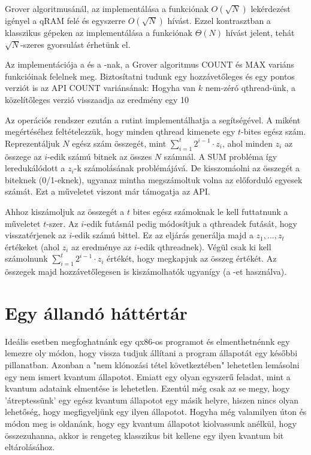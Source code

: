 \indent Grover algoritmusánál, az implementálása a  funkciónak ${O(\sqrt{N})}$ lekérdezést igényel a qRAM felé és egyszerre ${O(\sqrt{N})}$ hívást.
Ezzel kontrasztban a klasszikus gépeken az implementálása a  funkciónak ${\Theta(N)}$ hívást jelent, tehát $\sqrt{N}$-szeres gyorsulást érhetünk el.

\indent Az implementációja a  és a -nak, a Grover algoritmus COUNT és MAX variáns funkcióinak felelnek meg.
Biztosítatni tudunk egy hozzávetőleges és egy pontos verziót is az API COUNT variánsának: Hogyha van $k$ nem-zéró qthread-ünk, a közelítőleges verzió visszaadja az eredmény egy 10%

\indent Az operációs rendszer ezután a  rutint implementálhatja a  segítségével.
A miként megértéséhez feltételezzük, hogy minden qthread kimenete egy $t$-bites egész szám.
Reprezentáljuk $N$ egész szám összegét, mint $\sum_{i=1}^{t}{2^{i-1}\cdot z_i}$, ahol minden $z_i$ az összege az $i$-edik számú bitnek az összes $N$ számnál.
A SUM probléma így leredukálódott a $z_i$-k számolásának problémájává.
De kisszomáolni az összegét a biteknek (0/1-eknek), ugyanaz mintha megszámoltuk volna az előforduló egyesek számát.
Ezt a műveletet viszont már támogatja az API.

\indent Ahhoz kiszámoljuk az összegét a $t$ bites egész számoknak le kell futtatnunk a  műveletet $t$-szer.
Az $i$-edik futásnál pedig módosítjuk a qthreadek futását, hogy visszatérjenek az $i$-edik számú bittel.
Ez az eljárás generálja majd a $z_1,...,z_t$ értékeket (ahol $z_i$ az eredménye az $i$-edik qthreadnek). Végül csak ki kell számolnunk $\sum_{i=1}^{t}{2^{i-1}\cdot z_i}$ értékét, hogy megkapjuk az összeg értékét.
Az összegek majd hozzávetőlegesen is kiszámolhatók ugyanígy (a -et használva).
\section{Egy állandó háttértár}

\indent Ideális esetben megfoghatnánk egy qx86-os programot és elmenthetnénnk egy lemezre oly módon, hogy vissza tudjuk állítani a program állapotát egy későbbi pillanatban.
Azonban a "nem klónozási tétel következtében" lehetetlen lemásolni egy nem ismert kvantum állapotot.
Emiatt egy olyan egyszerű feladat, mint a kvantum adataink elmentése is lehetetlen.
Ezentúl még csak az se megy, hogy 'átreptessünk' egy egész kvantum állapotot egy másik helyre, hiszen nincs olyan lehetőség, hogy megfigyeljünk egy ilyen állapotot.
Hogyha még valamilyen úton és módon meg is oldanánk, hogy egy kvantum állapotot kiolvassunk anélkül, hogy összezuhanna, akkor is rengeteg klasszikus bit kellene egy ilyen kvantum bit eltárolásához.

